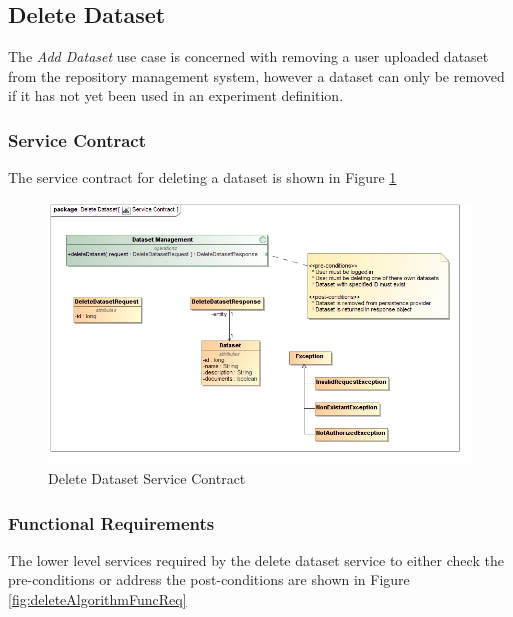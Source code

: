 \subsection {Delete Dataset}
The \textit{Add Dataset} use case is concerned with removing a user uploaded
dataset from the repository management system, however a dataset can only be
removed if it has not yet been used in an experiment definition.

\subsubsection{Service Contract}
The service contract for deleting a dataset is shown in Figure \ref{fig:deleteDatasetService}

\begin{figure}[H]
  \begin{center}
  \includegraphics[scale=0.38]{../Diagrams and Charts/Repository Management/Delete Dataset Service Contract.jpg}
  \caption{Delete Dataset Service Contract}
  \label{fig:deleteDatasetService}
  \end{center}  
 \end{figure}

\subsubsection{Functional Requirements}
The lower level services required by the delete dataset service to either check the
pre-conditions or address the post-conditions are shown in Figure \ref{fig:deleteAlgorithmFuncReq}

